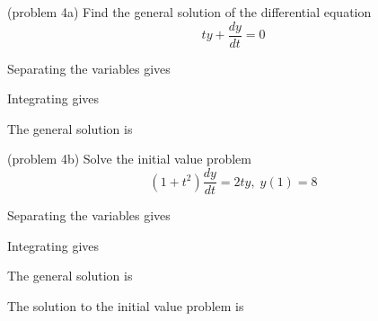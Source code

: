 \documentclass{ximera}
\begin{document}
\begin{problem}(problem 4a)
Find the general solution of the differential equation
\[
ty + \frac{dy}{dt} = 0
\]

Separating the variables gives

\begin{multipleChoice}
\end{multipleChoice}

Integrating gives

\begin{multipleChoice}
\end{multipleChoice}

The general solution is

\begin{multipleChoice}
\end{multipleChoice}

\end{problem}



\begin{problem}(problem 4b)
Solve the initial value problem
\[
(1+t^2)\frac{dy}{dt} = 2ty, \; y(1) = 8
\]

Separating the variables gives

\begin{multipleChoice}
\end{multipleChoice}

Integrating gives

\begin{multipleChoice}
\end{multipleChoice}

The general solution is

\begin{multipleChoice}
\end{multipleChoice}

The solution to the initial value problem is

\begin{multipleChoice}
\end{multipleChoice}

\end{problem}
\end{document}
